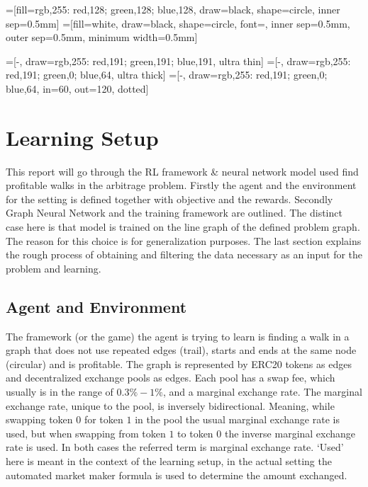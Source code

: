 
\renewcommand{\algorithmicrequire}{\textbf{Input:}}
\renewcommand{\algorithmicensure}{\textbf{Output:}}
=[fill={rgb,255: red,128; green,128; blue,128},
draw=black, shape=circle, inner sep=0.5mm]
=[fill=white, draw=black, shape=circle, font=\scriptsize,
        inner sep=0.5mm, outer sep=0.5mm, minimum width=0.5mm]

=[-, draw={rgb,255: red,191; green,191; blue,191}, ultra thin]
=[-, draw={rgb,255: red,191; green,0; blue,64},
ultra thick]
=[-, draw={rgb,255: red,191; green,0; blue,64}, in=60, out=120, dotted]



\maketitle

\section{Learning Setup}
This report will go through the RL framework \& neural network model used
find profitable walks in the arbitrage problem. Firstly the agent and the
environment for the setting is defined together with objective and the
rewards. Secondly Graph Neural Network and the training framework are
outlined. The distinct case here is that model is trained on the line graph
of the defined problem graph. The reason for this choice is for
generalization purposes. The last section explains the rough process of
obtaining and filtering the data necessary as an input for the problem and
learning.

\subsection{Agent and Environment}
The framework (or the game) the agent is trying to learn is finding a walk
in a graph that does not use repeated edges (trail), starts and ends at
the same node (circular) and is profitable. The graph is represented by ERC20 \cite{erc20}
tokens as edges and decentralized exchange pools as edges. Each pool has a
swap fee, which usually is in the range of $0.3\%-1\%$, and a marginal
exchange rate. The marginal exchange rate, unique to the pool, is inversely
bidirectional. Meaning, while swapping token $0$ for token $1$ in the pool
the usual marginal exchange rate is used, but when swapping from token $1$ to
token $0$ the inverse marginal exchange rate is used. In both cases the
referred term is marginal exchange rate. `Used' here is meant in the context
of the learning setup, in the actual setting the automated market maker
formula is used to determine the amount exchanged.
\newline


